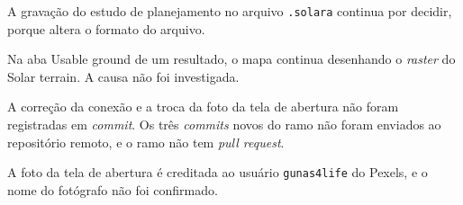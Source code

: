 \documentclass[10pt,a4paper,oneside,onecolumn]{book}
\begin{document}
\begin{ficha}
  \item[Estudo] A gravação do estudo de planejamento no arquivo
                \texttt{.solara} continua por decidir, porque altera o
                formato do arquivo.
  \item[Mapa] Na aba Usable ground de um resultado, o mapa continua
              desenhando o \emph{raster} do Solar terrain. A causa não foi
              investigada.
  \item[\emph{Commits}] A correção da conexão e a troca da foto da tela de
                abertura não foram registradas em \emph{commit}. Os três
                \emph{commits} novos do ramo não foram enviados ao
                repositório remoto, e o ramo não tem \emph{pull request}.
  \item[Crédito] A foto da tela de abertura é creditada ao usuário
                 \texttt{gunas4life} do Pexels, e o nome do fotógrafo não
                 foi confirmado.
\end{ficha}
\end{document}
